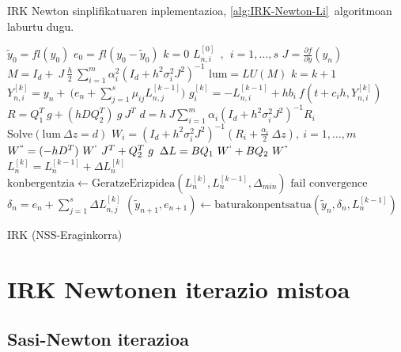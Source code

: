 \begin{enumerate}
\end{enumerate}


IRK Newton sinplifikatuaren inplementazioa, \ref{alg:IRK-Newton-Li}~algoritmoan laburtu dugu. 

\begin{algorithm}[h!]
 \BlankLine
  $\tilde{y}_0=fl(y_0)$\;
  $e_0=fl(y_0-\tilde{y}_0)$\;
  {
   \BlankLine
   $k=0$\;
     $L_{n,i}^{[0]} \ \ , \ \ i=1,\dots,s $\;
   \BlankLine
   $J=\frac{\partial f}{\partial y}(y_n) $\; 
   \BlankLine
   $ M=I_d+ \ J \ \frac{h}{2}\ \sum\limits_{i=1}^{m} \alpha_i^2 (I_d+h^2 \sigma_i^2 J^2)^{-1} $\;
   $ \mathrm{lum}=LU(M)$\;
   \BlankLine  
   {
    \BlankLine 
    $k=k+1$\;
    $Y_{n,i}^{[k]}=y_{n} + \ \big(e_n+\sum\limits_{j=1}^{s} \mu_{ij} L_{n,j}^{[k-1]}\big)  $\;  
    \BlankLine
    $g_i^{[k]}= -L_{n,i}^{[k-1]}+ hb_i \ f(t+c_ih, Y_{n,i}^{[k]}) $\;
    \BlankLine
    $R=Q_1^T \ g  + (h D Q_2^T) \ g \ J^T $\;
    $d=h \ J \sum\limits_{i=1}^{m}\alpha_i (I_d+h^2\sigma_i^2J^2)^{-1}R_i$\;
    $\text{Solve}(\mathrm{lum} \ \Delta z = d)$\;
    \BlankLine 
    $W_i=(I_d+h^2\sigma_i^2J^2)^{-1} (R_i+\frac{\alpha_i}{2} \ \Delta z), \ i=1,\dots,m$\;
    \BlankLine
    $W^{``}= (-hD^T) \ W^{`} \ J^T+Q_2^T \ g$\;
    \BlankLine
    $\Delta L =B Q_1 \ W^{`}+B Q_2 \ W^{``} $\;
    $L_n^{[k]}=L_n^{[k-1]}+\Delta L_n^{[k]}$\;
    $\text{konbergentzia} \leftarrow \text{GeratzeErizpidea}(L_n^{[k]},L_n^{[k-1]},\Delta_{min}) $\;
   }
 \BlankLine
   {
    {$\text{fail convergence}$\;}
   }
   $\delta_{n}={e}_{n} + \sum\limits_{j=1}^{s}\Delta L_{n,j}^{[k]}$\;
   $(\tilde y_{n+1}, e_{n+1})\leftarrow \text{baturakonpentsatua}(\tilde y_{n},\delta_{n},L_{n}^{[k-1]})$\;
 }
 \caption{IRK (NSS-Eraginkorra)}
 \label{alg:IRK-Newton-Li}
\end{algorithm}


\clearpage


\section{IRK Newtonen iterazio mistoa}
\label{sec:7.6}

\subsection{Sasi-Newton iterazioa}


